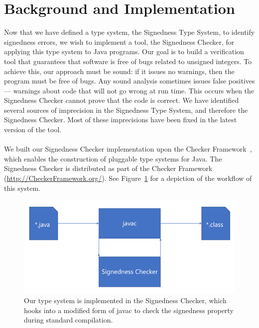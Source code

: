 \newpage
\section{Background and Implementation} \label{imp}

Now that we have defined a type system, the Signedness Type System, to identify
signedness errors, we wish to implement a tool, the Signedness Checker,
for applying this type system
to Java programs.
Our goal is to build a verification tool that guarantees that software is
free of bugs related to unsigned integers. To achieve this, our approach
must be sound:  if it issues no warnings, then the program must be free of
bugs.
Any sound analysis sometimes issues false positives --- warnings about
code that will not go wrong at run time.  This occurs when the
Signedness Checker cannot prove that the code is correct. We have identified
several sources of imprecision in the Signedness Type System, and therefore the
Signedness Checker. Most of these imprecisions have been fixed in the latest
version of the tool.\\
\\
We built our Signedness Checker implementation upon the
Checker Framework~\cite{PapiACPE2008,DietlDEMS2011}, which enables the
construction of pluggable type systems for Java.
The Signedness Checker is distributed as part of the Checker Framework
(\url{http://CheckerFramework.org/}). See Figure~\ref{fig:system} for a
depiction of the workflow of this system.

\begin{figure}
\centering
\includegraphics[scale=0.65]{signedness-system}
\caption{Our type system is implemented in the Signedness Checker, which
hooks into a modified form of javac to check the signedness property during
standard compilation.}
\label{fig:system}
\end{figure}


